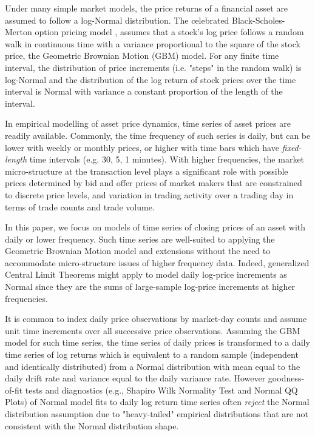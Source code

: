 \documentclass{article}
\begin{document}
Under many simple market models, the price returns of a financial asset are assumed to follow a log-Normal distribution.  The celebrated Black-Scholes-Merton option pricing model \cite{blackscholes}, %
assumes that a stock's log price follows a random walk in continuous time with a variance proportional to the square of the stock price, the Geometric Brownian Motion (GBM) model.
For any finite time interval, the distribution of price increments (i.e. "steps" in the random walk) is log-Normal and the distribution of the log return of stock prices over the time interval is Normal with variance a constant proportion of the length of the interval.

In empirical modelling of asset price dynamics, time series of asset prices are readily available. Commonly, the time frequency of such series is daily, but can be lower with weekly or monthly prices,  or higher with  time bars  which have \textit{fixed-length} time intervals (e.g. 30, 5, 1 minutes).  With higher frequencies, the market micro-structure at the transaction level plays a significant role with possible prices determined by bid and offer prices of market makers that are constrained to discrete price levels, and variation in trading activity over a trading day in terms of trade counts and trade volume.

In this paper, we focus on models of time series of closing prices of an asset with daily or lower frequency. Such time series are well-suited to applying the Geometric Brownian Motion model and extensions without the need to accommodate micro-structure issues of higher frequency data. Indeed, generalized  Central Limit Theorems might apply to model daily log-price increments as Normal since they are the sums of large-sample log-price increments at higher frequencies.

It is common to index daily price observations by market-day counts and assume  unit time increments over all successive price observations. Assuming the GBM model for such time series,  the time series of daily prices is transformed to a daily time series of log returns which is equivalent to a random sample (independent and identically distributed) from a Normal distribution  with mean equal to the daily drift rate and variance equal to the daily variance rate. However goodness-of-fit tests and diagnostics (e.g., Shapiro Wilk Normality Test \cite{ShapiroWilk1965} and Normal QQ Plots) of Normal model fits to  daily log return time series often \textit{reject} the Normal distribution assumption due to "heavy-tailed" empirical distributions that are not consistent with the Normal distribution shape.
\end{document}
